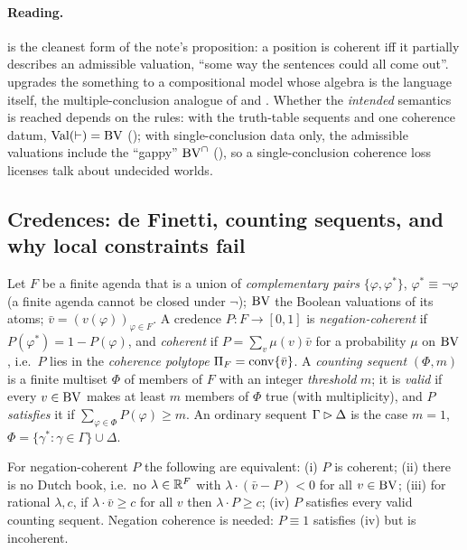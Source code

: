 \paragraph{Reading.}  is the cleanest form of the note's proposition: a position is coherent iff it partially describes an admissible valuation, ``some way the sentences could all come out''.  upgrades the something to a compositional model whose algebra is the language itself, the multiple-conclusion analogue of \citet{los1958remarks} and \citet{wojcicki1988theory}. Whether the \emph{intended} semantics is reached depends on the rules: with the truth-table sequents and one coherence datum, $\mathrm{Val}(\vdash)=\mathrm{BV}$ (); with single-conclusion data only, the admissible valuations include the ``gappy'' $\mathrm{BV}^\cap$ (), so a single-conclusion coherence loss licenses talk about undecided worlds.

\subsection{Credences: de Finetti, counting sequents, and why local constraints fail}\label{sec:existence:credences}

Let $F$ be a finite agenda that is a union of \emph{complementary pairs} $\{\varphi,\varphi^*\}$, $\varphi^*\equiv\neg\varphi$ (a finite agenda cannot be closed under $\neg$); $\mathrm{BV}$ the Boolean valuations of its atoms; $\bar v=(v(\varphi))_{\varphi\in F}$. A credence $P:F\to[0,1]$ is \emph{negation-coherent} if $P(\varphi^*)=1-P(\varphi)$, and \emph{coherent} if $P=\sum_v\mu(v)\bar v$ for a probability $\mu$ on $\mathrm{BV}$, i.e.\ $P$ lies in the \emph{coherence polytope} $\Pi_F=\mathrm{conv}\{\bar v\}$. A \emph{counting sequent} $(\Phi,m)$ is a finite multiset $\Phi$ of members of $F$ with an integer \emph{threshold} $m$; it is \emph{valid} if every $v\in\mathrm{BV}$ makes at least $m$ members of $\Phi$ true (with multiplicity), and $P$ \emph{satisfies} it if $\sum_{\varphi\in\Phi}P(\varphi)\ge m$. An ordinary sequent $\Gamma\rhd\Delta$ is the case $m=1$, $\Phi=\{\gamma^*:\gamma\in\Gamma\}\cup\Delta$.

\begin{theorem}\label{thm:existence:definetti}
For negation-coherent $P$ the following are equivalent: \textup{(i)} $P$ is coherent; \textup{(ii)} there is no Dutch book, i.e.\ no $\lambda\in\mathbb{R}^F$ with $\lambda\cdot(\bar v-P)<0$ for all $v\in\mathrm{BV}$; \textup{(iii)} for rational $\lambda,c$, if $\lambda\cdot\bar v\ge c$ for all $v$ then $\lambda\cdot P\ge c$; \textup{(iv)} $P$ satisfies every valid counting sequent. Negation coherence is needed: $P\equiv1$ satisfies (iv) but is incoherent.
\end{theorem}

